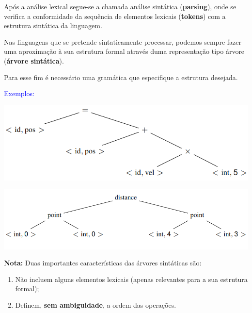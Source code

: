 \documentclass{article}
\begin{document}
\begin{flushleft}
  \item Após a análise lexical segue-se a chamada análise
  sintática (\textbf{parsing}), onde se verifica a conformidade da
  sequência de elementos lexicais (\textbf{tokens}) com a estrutura
  sintática da linguagem.
  \item Nas linguagens que se pretende sintaticamente
  processar, podemos sempre fazer uma aproximação à sua
  estrutura formal através duma representação tipo árvore (\textbf{árvore sintática}).
  \item Para esse fim é necessário uma gramática que
  especifique a estrutura desejada.
\end{flushleft}

\begin{flushleft}
  \textcolor{Blue}{Exemplos:}
\end{flushleft}

\begin{center}
  \includegraphics[scale=0.35]{8}
\end{center}

\begin{center}
  \includegraphics[scale=0.35]{9}
\end{center}

\begin{flushleft}
  \textbf{Nota:} Duas importantes características das árvores sintáticas são:

  \begin{enumerate}
    \item Não incluem alguns elementos lexicais (apenas relevantes para a sua estrutura formal);
    \item Definem, \textbf{sem ambiguidade}, a ordem das operações.
  \end{enumerate}
\end{flushleft}
\end{document}

